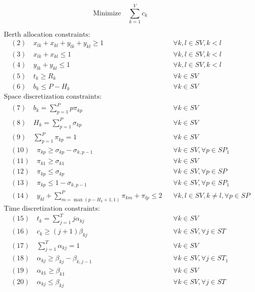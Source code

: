 \documentclass[10pt]{article}
\begin{document}
\[\text{Minimize} \quad \sum_{k=1}^{V} c_k\]

\begin{align*}
& \text{Berth allocation constraints:} \\
& \quad (2) \quad x_{lk} + x_{kl} + y_{lk} + y_{kl} \ge 1 && \forall k, l \in SV, k < l \\
& \quad (3) \quad x_{lk} + x_{kl} \le 1 && \forall k, l \in SV, k < l \\
& \quad (4) \quad y_{lk} + y_{kl} \le 1 && \forall k, l \in SV, k < l \\
& \quad (5) \quad t_k \ge R_k && \forall k \in SV \\
& \quad (6) \quad b_k \le P - H_k && \forall k \in SV \\
& \text{Space discretization constraints:} \\
& \quad (7) \quad b_k = \sum_{p=1}^{P} p \pi_{kp} && \forall k \in SV \\
& \quad (8) \quad H_k = \sum_{p=1}^{P} \sigma_{kp} && \forall k \in SV \\
& \quad (9) \quad \sum_{p=1}^{P} \pi_{kp} = 1 && \forall k \in SV \\
& \quad (10) \quad \pi_{kp} \ge \sigma_{kp} - \sigma_{k, p-1} && \forall k \in SV, \forall p \in SP_1 \\
& \quad (11) \quad \pi_{k1} \ge \sigma_{k1} && \forall k \in SV \\
& \quad (12) \quad \pi_{kp} \le \sigma_{kp} && \forall k \in SV, \forall p \in SP \\
& \quad (13) \quad \pi_{kp} \le 1 - \sigma_{k, p-1} && \forall k \in SV, \forall p \in SP_1 \\
& \quad (14) \quad y_{kl} + \sum_{m=\max(p-H_k+1,1)}^{P} \pi_{km} + \pi_{lp} \le 2 && \forall k, l \in SV, k \neq l, \forall p \in SP \\
& \text{Time discretization constraints:} \\
& \quad (15) \quad t_k = \sum_{j=1}^{T} j \alpha_{kj} && \forall k \in SV \\
& \quad (16) \quad c_k \ge (j+1) \beta_{kj} && \forall k \in SV, \forall j \in ST \\
& \quad (17) \quad \sum_{j=1}^{T} \alpha_{kj} = 1 && \forall k \in SV \\
& \quad (18) \quad \alpha_{kj} \ge \beta_{kj} - \beta_{k, j-1} && \forall k \in SV, \forall j \in ST_1 \\
& \quad (19) \quad \alpha_{k1} \ge \beta_{k1} && \forall k \in SV \\
& \quad (20) \quad \alpha_{kj} \le \beta_{kj} && \forall k \in SV, \forall j \in ST \\

\end{align*}
\end{document}
